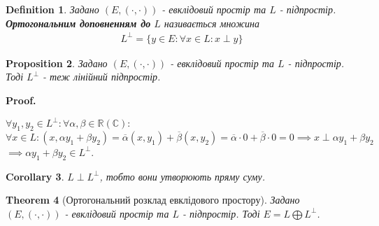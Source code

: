 \documentclass[a4paper, 10pt]{article}
\makeatletter
\def\qed{$\blacksquare$}
\theoremstyle{theoremdd}
\newtheorem{theorem}{Theorem}[subsection]
\theoremstyle{theoremdd}
\newtheorem{definition}[theorem]{Definition}
\theoremstyle{theoremdd}
\theoremstyle{theoremdd}
\theoremstyle{theoremdd}
\newtheorem{proposition}[theorem]{Proposition}
\theoremstyle{theoremdd}
\theoremstyle{theoremdd}
\theoremstyle{theoremdd}
\newtheorem{corollary}[theorem]{Corollary}
\renewenvironment{proof}[1][Proof.\\]{\par
\pushQED{\hfill \qed}%
\normalfont \topsep6\p@\@plus6\p@\relax
\trivlist
\item\relax
{\bfseries
#1\@addpunct{.}}\hspace\labelsep\ignorespaces
}{%
\popQED\endtrivlist\@endpefalse
}
\makeatother
\begin{document}
\begin{definition}
Задано $(E, (\cdot,\cdot))$ - евклідовий простір та $L$ - підпростір.\\
\textbf{Ортогональним доповненням до} $L$ називається множина
\begin{align*}
L^{\perp} = \{y \in E: \forall x \in L: x \perp y\}
\end{align*}
\end{definition}

\begin{proposition}
Задано $(E, (\cdot,\cdot))$ - евклідовий простір та $L$ - підпростір.\\
Тоді $L^{\perp}$ - теж лінійний підпростір.
\end{proposition}

\begin{proof}
$\forall y_1,y_2 \in L^{\perp}: \forall \alpha,\beta \in \mathbb{R} (\mathbb{C}):$\\
$\forall x \in L: (x, \alpha y_1+ \beta y_2) = \overline{\alpha} (x,y_1) + \overline{\beta} (x,y_2) = \overline{\alpha} \cdot 0 + \overline{\beta} \cdot 0 = 0 \implies x \perp \alpha y_1 + \beta y_2$\\
$\implies \alpha y_1 + \beta y_2 \in L^{\perp}$.
\end{proof}

\begin{corollary}
$L \perp L^\perp$, тобто вони утворюють пряму суму.
\end{corollary}

\begin{theorem}[Ортогональний розклад евклідового простору]
Задано $(E, (\cdot,\cdot))$ - евклідовий простір та $L$ - підпростір.
Тоді $E = L \bigoplus L^{\perp}$.
\end{theorem}
\end{document}
